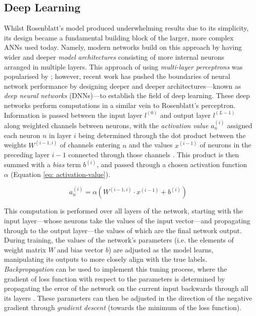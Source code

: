 \documentclass[a4paper, 11pt]{report}
\begin{document}
    \subsection{Deep Learning}

    Whilst Rosenblatt's model produced underwhelming results due to its simplicity, its design became a fundamental building block of the larger, more complex ANNs used today. Namely, modern networks build on this approach by having wider and deeper \emph{model architectures} consisting of more internal neurons arranged in multiple layers. This approach of using \emph{multi-layer perceptrons} was popularised by \citet{rumelhart-1986}; however, recent work has pushed the boundaries of neural network performance by designing deeper and deeper architectures---known as \emph{deep neural networks} (DNNs)---to establish the field of deep learning. These deep networks perform computations in a similar vein to Rosenblatt's perceptron. Information is passed between the input layer $l^{(0)}$ and output layer $l^{(L-1)}$ along weighted channels between neurons, with the \emph{activation value} $a^{(i)}_n$ assigned each neuron $n$ in layer $i$ being determined through the dot product between the weights $W^{(i-1, i)}$ of channels entering $n$ and the values $x^{(i-1)}$ of neurons in the preceding layer $i-1$ connected through those channels \citep{witten-2017}. This product is then summed with a \emph{bias} term $b^{(i)}$, and passed through a chosen activation function $\alpha$ (Equation \ref{eq: activation-value}).

    \begin{equation}
        \label{eq: activation-value}
        a^{(i)}_n = \alpha( W^{(i-1, i)} \cdot x^{(i-1)} + b^{(i)} )
    \end{equation}

    This computation is performed over all layers of the network, starting with the input layer---whose neurons take the values of the input vector---and propagating through to the output layer—the values of which are the final network output. During training, the values of the network's parameters (i.e. the elements of weight matrix $W$ and bias vector $b$) are adjusted as the model learns, manipulating its outputs to more closely align with the true labels. \emph{Backpropagation} can be used to implement this tuning process, where the gradient of loss function with respect to the parameters is determined by propagating the error of the network on the current input backwards through all its layers \citep{zaras-2022}. These parameters can then be adjusted in the direction of the negative gradient through \emph{gradient descent} (towards the minimum of the loss function).
\end{document}
